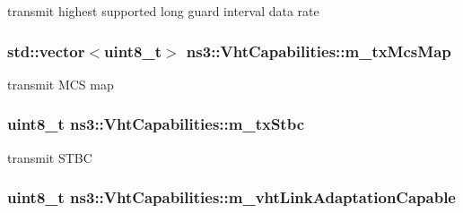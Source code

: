transmit highest supported long guard interval data rate 

\subsubsection[{\texorpdfstring{m\+\_\+tx\+Mcs\+Map}{m_txMcsMap}}]{\setlength{\rightskip}{0pt plus 5cm}std\+::vector$<$uint8\+\_\+t$>$ ns3\+::\+Vht\+Capabilities\+::m\+\_\+tx\+Mcs\+Map\hspace{0.3cm}{\ttfamily [private]}}\hypertarget{classns3_1_1VhtCapabilities_a68564d3214b16af69746c99c0bdbf885}{}\label{classns3_1_1VhtCapabilities_a68564d3214b16af69746c99c0bdbf885}


transmit M\+CS map 

\subsubsection[{\texorpdfstring{m\+\_\+tx\+Stbc}{m_txStbc}}]{\setlength{\rightskip}{0pt plus 5cm}uint8\+\_\+t ns3\+::\+Vht\+Capabilities\+::m\+\_\+tx\+Stbc\hspace{0.3cm}{\ttfamily [private]}}\hypertarget{classns3_1_1VhtCapabilities_a67911a0a1dbc994b8b9c79567cc1059b}{}\label{classns3_1_1VhtCapabilities_a67911a0a1dbc994b8b9c79567cc1059b}


transmit S\+T\+BC 

\subsubsection[{\texorpdfstring{m\+\_\+vht\+Link\+Adaptation\+Capable}{m_vhtLinkAdaptationCapable}}]{\setlength{\rightskip}{0pt plus 5cm}uint8\+\_\+t ns3\+::\+Vht\+Capabilities\+::m\+\_\+vht\+Link\+Adaptation\+Capable\hspace{0.3cm}{\ttfamily [private]}}\hypertarget{classns3_1_1VhtCapabilities_a271c69d342916c0dbd34e4847a7373a2}{}\label{classns3_1_1VhtCapabilities_a271c69d342916c0dbd34e4847a7373a2}


